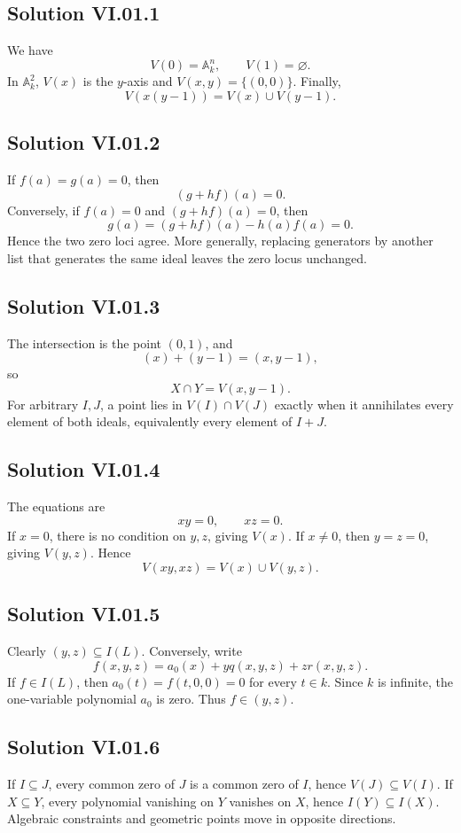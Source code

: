 
\subsection*{Solution VI.01.1}
We have
\[
V(0)=\mathbb A_k^n,
\qquad
V(1)=\varnothing.
\]
In \(\mathbb A_k^2\), \(V(x)\) is the \(y\)-axis and \(V(x,y)=\{(0,0)\}\).  Finally,
\[
V(x(y-1))=V(x)\cup V(y-1).
\]

\subsection*{Solution VI.01.2}
If \(f(a)=g(a)=0\), then
\[
(g+hf)(a)=0.
\]
Conversely, if \(f(a)=0\) and \((g+hf)(a)=0\), then
\[
g(a)=(g+hf)(a)-h(a)f(a)=0.
\]
Hence the two zero loci agree.  More generally, replacing generators by another list that
generates the same ideal leaves the zero locus unchanged.

\subsection*{Solution VI.01.3}
The intersection is the point \((0,1)\), and
\[
(x)+(y-1)=(x,y-1),
\]
so
\[
X\cap Y=V(x,y-1).
\]
For arbitrary \(I,J\), a point lies in \(V(I)\cap V(J)\) exactly when it annihilates every
element of both ideals, equivalently every element of \(I+J\).

\subsection*{Solution VI.01.4}
The equations are
\[
xy=0,
\qquad
xz=0.
\]
If \(x=0\), there is no condition on \(y,z\), giving \(V(x)\).  If \(x\neq0\), then
\(y=z=0\), giving \(V(y,z)\).  Hence
\[
V(xy,xz)=V(x)\cup V(y,z).
\]

\subsection*{Solution VI.01.5}
Clearly \((y,z)\subseteq I(L)\).  Conversely, write
\[
f(x,y,z)=a_0(x)+yq(x,y,z)+zr(x,y,z).
\]
If \(f\in I(L)\), then \(a_0(t)=f(t,0,0)=0\) for every \(t\in k\).  Since \(k\) is
infinite, the one-variable polynomial \(a_0\) is zero.  Thus \(f\in(y,z)\).

\subsection*{Solution VI.01.6}
If \(I\subseteq J\), every common zero of \(J\) is a common zero of \(I\), hence
\(V(J)\subseteq V(I)\).  If \(X\subseteq Y\), every polynomial vanishing on \(Y\) vanishes
on \(X\), hence \(I(Y)\subseteq I(X)\).  Algebraic constraints and geometric points move
in opposite directions.

